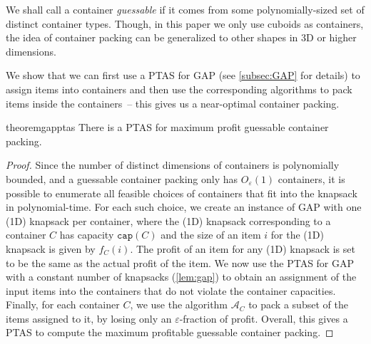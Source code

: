 \documentclass[10pt,a4paper]{amsart}
\renewcommand{\epsilon}{\varepsilon} %
\newcommand{\AM}{\mathcal{A}}
\newcommand{\boxes}{containers\xspace}
\theoremstyle{definition}
\begin{document}
We shall call a container \emph{guessable} if it comes from some polynomially-sized set of distinct container types. Though, in this paper we only use cuboids as \boxes, the idea of container packing can be generalized to other shapes in 3D or higher dimensions. 

We show that we can first use a PTAS for GAP (see \cref{subsec:GAP} for details) to assign items into \boxes and
then use the corresponding algorithms to pack items inside the \boxes\ -- this gives us a near-optimal container packing.


\begin{restatable}{theorem}{gapptas}
\label{thm:ptasboxpacking}
    There is a PTAS for maximum profit guessable container packing.
\end{restatable}
\begin{proof}
    Since the number of distinct dimensions of containers is polynomially bounded, and a guessable container packing only has $O_{\epsilon}(1)$ containers, it is possible to enumerate all feasible choices of containers that fit into the knapsack in polynomial-time. For each such choice, we create an instance of GAP with one (1D) knapsack per container, where the (1D) knapsack corresponding to a container $C$ has capacity $\mathtt{cap}(C)$ and the size of an item $i$ for the (1D) knapsack is given by $f_C(i)$. The profit of an item for any (1D) knapsack is set to be the same as the actual profit of the item. We now use the PTAS for GAP with a constant number of knapsacks
    (\cref{lem:gap})
    to obtain an assignment of the input items into the containers that do not violate the container capacities. Finally, for each container $C$, we use the algorithm $\AM_C$ to pack a subset of the items assigned to it, by losing only an $\epsilon$-fraction of profit. Overall, this gives a PTAS to compute the maximum profitable guessable container packing. 
\end{proof}

\end{document}
